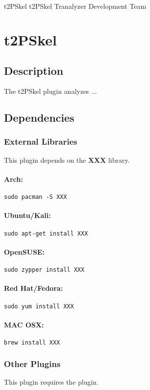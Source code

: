 \documentclass[documentation]{subfiles}
\begin{document}
\trantitle
    {t2PSkel} %
    {t2PSkel} %
    {Tranalyzer Development Team} %

\section{t2PSkel}\label{s:t2PSkel}

\subsection{Description}
The t2PSkel plugin analyzes ...

\subsection{Dependencies}



\subsubsection{External Libraries}
This plugin depends on the {\bf XXX} library.
\paragraph{Arch:} {\tt sudo pacman -S XXX}
\paragraph{Ubuntu/Kali:} {\tt sudo apt-get install XXX}
\paragraph{OpenSUSE:} {\tt sudo zypper install XXX}
\paragraph{Red Hat/Fedora:} {\tt sudo yum install XXX}
\paragraph{MAC OSX:} {\tt brew install XXX}

\subsubsection{Other Plugins}
This plugin requires the  plugin.
\end{document}
